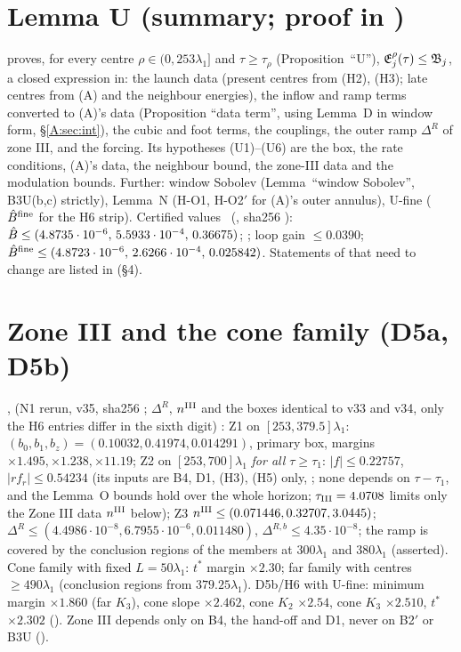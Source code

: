 \documentclass[11pt]{article}
\begin{document}


\section{Lemma U (summary; proof in )}\label{M:sec:U}
 proves, for every centre $\rho\in(0,253\lambda_1]$ and $\tau\ge\tau_\rho$ (Proposition~``U''), $\mathfrak E^\rho_j(\tau)\le\mathfrak B_j$, a closed expression in: the launch data (present centres from (H2), (H3); late centres from (A) and the neighbour energies), the inflow and ramp terms converted to (A)'s data (Proposition ``data term'', using Lemma~D in window form, \S\ref{A:sec:int}), the cubic and foot terms, the couplings, the outer ramp $\Delta^R$ of zone III, and the forcing. Its hypotheses (U1)--(U6) are the box, the rate conditions, (A)'s data, the neighbour bound, the zone-III data and the modulation bounds. Further: window Sobolev (Lemma~``window Sobolev'', B3U(b,c) strictly), Lemma~N (H-O1, H-O2$'$ for (A)'s outer annulus), U-fine ($\hat B^{\rm fine}$ for the H6 strip). Certified values \tC\ (, sha256 ): $\hat B\le(4.8735\cdot10^{-6},\,5.5933\cdot10^{-4},\,0.36675)$; \UmarV; loop gain $\le0.0390$; $\hat B^{\rm fine}\le(4.8723\cdot10^{-6},\,2.6266\cdot10^{-4},\,0.025842)$. Statements of  that need to change are listed in  (\S4).

\section{Zone III and the cone family (D5a, D5b)}\label{M:sec:zone3}
,  (N1 rerun, v35, sha256 ; $\Delta^R$, $n^{\rm III}$ and the boxes identical to v33 and v34, only the H6 entries differ in the sixth digit) \tC: Z1 on $[253,379.5]\lambda_1$: $(b_0,b_1,b_z)=(0.10032,0.41974,0.014291)$, primary box, margins $\times1.495,\times1.238,\times11.19$; Z2 on $[253,700]\lambda_1$ \emph{for all $\tau\ge\tau_1$}: $|f|\le0.22757$, $|rf_r|\le0.54234$ (its inputs are B4, D1, (H3), (H5) only, ; none depends on $\tau-\tau_1$, and the Lemma~O bounds hold over the whole horizon; $\tau_{\rm III}=4.0708$ limits only the Zone III data $n^{\rm III}$ below); Z3 $n^{\rm III}\le(0.071446,0.32707,3.0445)$; $\Delta^R\le(4.4986\cdot10^{-8},6.7955\cdot10^{-6},0.011480)$, $\Delta^{R,b}\le4.35\cdot10^{-8}$; the ramp is covered by the conclusion regions of the members at $300\lambda_1$ and $380\lambda_1$ (asserted). Cone family with fixed $L=50\lambda_1$: $t^*$ margin $\times2.30$; far family with centres $\ge490\lambda_1$ (conclusion regions from $379.25\lambda_1$). D5b/H6 with U-fine: minimum margin $\times1.860$ (far $K_3$), cone slope $\times2.462$, cone $K_2$ $\times2.54$, cone $K_3$ $\times2.510$, $t^*$ $\times2.302$ (). Zone III depends only on B4, the hand-off and D1, never on B2$'$ or B3U ().
\end{document}
